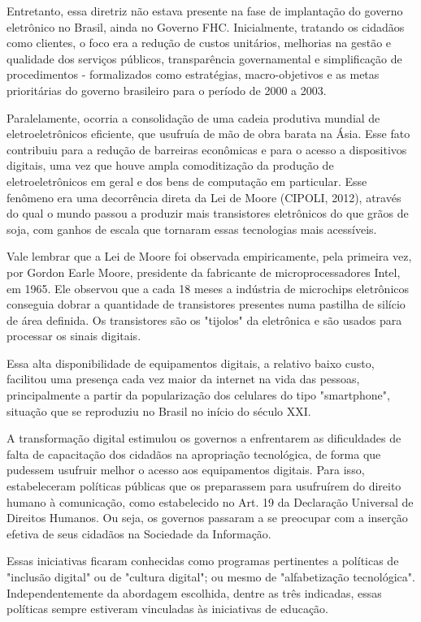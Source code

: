 Entretanto, essa diretriz não estava presente na fase de implantação do governo eletrônico no Brasil, ainda no Governo FHC. Inicialmente, tratando os cidadãos como clientes, o foco era a redução de custos unitários, melhorias na gestão e qualidade dos serviços públicos, transparência governamental e simplificação de procedimentos - formalizados como estratégias, macro-objetivos e  as metas prioritárias  do governo brasileiro para o período de 2000 a 2003.

Paralelamente, ocorria a consolidação de uma cadeia produtiva mundial de eletroeletrônicos eficiente, que usufruía de mão de obra barata na Ásia. Esse fato contribuiu para a redução de barreiras econômicas e para o acesso a dispositivos digitais, uma vez que houve ampla comoditização da produção de eletroeletrônicos em geral e dos bens de computação em particular. Esse fenômeno era uma decorrência direta da Lei de Moore (CIPOLI, 2012), através do qual o mundo passou a produzir mais transistores eletrônicos do que grãos de soja, com ganhos de escala que tornaram essas tecnologias mais acessíveis.

Vale lembrar que a Lei de Moore foi observada empiricamente, pela primeira vez, por Gordon Earle Moore, presidente da fabricante de microprocessadores Intel, em 1965. Ele observou que a cada 18 meses a indústria de microchips eletrônicos conseguia dobrar a quantidade de transistores presentes numa pastilha de silício de área definida. Os transistores são os "tijolos" da eletrônica e são usados para processar os sinais digitais.

Essa alta disponibilidade de equipamentos digitais, a relativo baixo custo, facilitou uma presença cada vez maior da internet na vida das pessoas, principalmente a partir da popularização dos celulares do tipo "smartphone", situação que se reproduziu no Brasil no início do século XXI.

A transformação digital estimulou os governos a enfrentarem as dificuldades  de falta de  capacitação dos cidadãos na apropriação tecnológica, de forma que pudessem usufruir melhor o acesso aos equipamentos digitais. Para isso, estabeleceram políticas públicas que os preparassem para usufruírem do direito humano à comunicação, como estabelecido no Art. 19 da Declaração Universal de Direitos Humanos. Ou seja, os governos passaram a se preocupar com a inserção efetiva de seus cidadãos na Sociedade da Informação.

Essas iniciativas ficaram conhecidas como programas pertinentes a políticas de "inclusão digital" ou  de "cultura digital"; ou mesmo de "alfabetização tecnológica". Independentemente da abordagem escolhida, dentre as três indicadas, essas políticas sempre estiveram vinculadas às iniciativas de educação.

